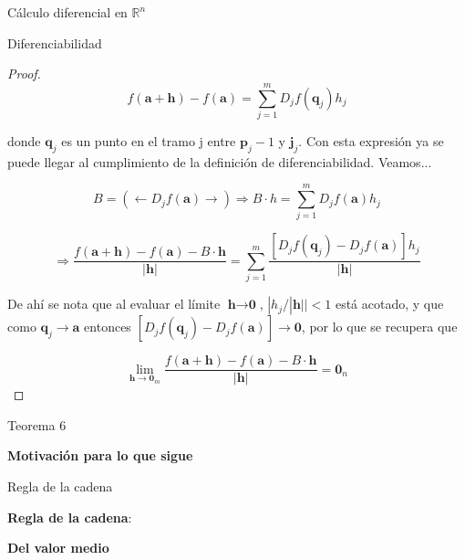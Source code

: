 \begin{chapter}{Cálculo diferencial en $\mathbb{R}^n$}
\begin{section}{Diferenciabilidad}
\begin{proof}
\begin{equation*}
    f(\textbf{a}+\textbf{h}) - f(\textbf{a}) = \sum_{j=1}^{m} D_jf(\textbf{q}_j) h_j
\end{equation*}

donde $\textbf{q}_j$ es un punto en el tramo j entre $\textbf{p}_j-1$ y $\textbf{j}_j$. Con esta expresión ya se puede llegar al cumplimiento de la definición de diferenciabilidad. Veamos...

\begin{equation*}
    B = (\leftarrow D_jf(\textbf{a}) \rightarrow) \Longrightarrow B\cdot h = \sum_{j=1}^{m} D_jf(\textbf{a})h_j
\end{equation*}

\begin{equation*}
    \Longrightarrow \frac{f(\textbf{a}+\textbf{h})-f(\textbf{a})-B\cdot \textbf{h}}{|\textbf{h}|} = \sum_{j=1}^{m} \frac{[D_jf(\textbf{q}_j)-D_jf(\textbf{a})]h_j}{|\textbf{h}|}
\end{equation*}

De ahí se nota que al evaluar el límite $\textbf{h} \rightarrow \textbf{0}$, $|h_j/|\textbf{h}|| <1$ está acotado, y que como $\textbf{q}_j\rightarrow\textbf{a}$ entonces $[D_jf(\textbf{q}_j) - D_jf(\textbf{a})] \rightarrow \textbf{0}$, por lo que se recupera que 

\begin{equation*}
    \lim_{\textbf{h}\rightarrow\textbf{0}_m}\frac{f(\textbf{a}+\textbf{h})-f(\textbf{a})-B\cdot \textbf{h}}{|\textbf{h}|} = \textbf{0}_n
\end{equation*}

\end{proof}

\begin{them}
Teorema 6
\end{them}

\begin{rem}
\textbf{Motivación para lo que sigue}
\end{rem}

\end{section}

\begin{section}{Regla de la cadena}

\begin{them}
\textbf{Regla de la cadena}:
\end{them}

\begin{coll}

\end{coll}

\begin{them}
\label{them:ValMedio}
\textbf{Del valor medio}
\end{them}


\end{section}


\end{chapter}